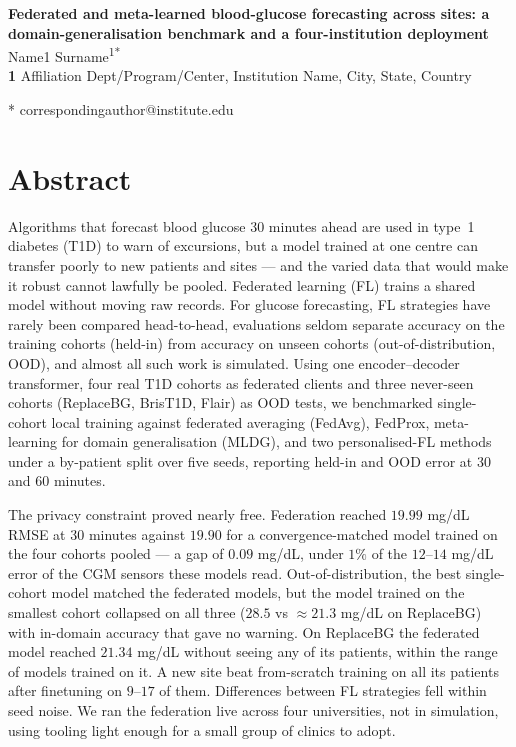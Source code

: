 \documentclass[10pt,letterpaper]{article}
\begin{document}
\vspace*{0.2in}

\begin{flushleft}
{\Large
\textbf{Federated and meta-learned blood-glucose forecasting across sites: a domain-generalisation benchmark and a four-institution deployment}
}
\newline
\\
Name1 Surname\textsuperscript{1*}
\\
\bigskip
\textbf{1} Affiliation Dept/Program/Center, Institution Name, City, State, Country
\\
\bigskip

* correspondingauthor@institute.edu

\end{flushleft}

\section*{Abstract}
Algorithms that forecast blood glucose 30 minutes ahead are used in type~1
diabetes (T1D) to warn of excursions, but a model trained at one centre can
transfer poorly to new patients and sites --- and the varied data that would
make it robust cannot lawfully be pooled. Federated learning (FL)
trains a shared model without moving raw records. For glucose forecasting, FL
strategies have rarely been compared head-to-head, evaluations
seldom separate accuracy on the training cohorts (held-in) from accuracy on
unseen cohorts (out-of-distribution, OOD), and almost all such work is
simulated. Using one encoder--decoder transformer, four real T1D cohorts as
federated clients and three never-seen cohorts (ReplaceBG, BrisT1D, Flair) as
OOD tests, we benchmarked single-cohort local training against federated
averaging (FedAvg), FedProx, meta-learning for domain generalisation (MLDG),
and two personalised-FL methods under a by-patient split over five seeds,
reporting held-in and OOD error at 30 and 60 minutes.

The privacy constraint proved nearly free. Federation reached $19.99$ mg/dL
RMSE at 30 minutes against $19.90$ for a convergence-matched model trained on
the four cohorts pooled --- a gap of $0.09$ mg/dL, under $1\%$ of the
$12$--$14$ mg/dL error of the CGM sensors these models read.
Out-of-distribution, the best single-cohort model matched the federated
models, but the model trained on the smallest cohort collapsed on all three
($28.5$ vs $\approx$$21.3$ mg/dL on ReplaceBG) with in-domain accuracy that
gave no warning. On ReplaceBG the federated model reached $21.34$ mg/dL
without seeing any of its patients, within the range of models trained on it.
A new site beat from-scratch training on all its patients after finetuning on
$9$--$17$ of them. Differences between FL strategies fell within seed noise.
We ran the federation live across four universities, not in simulation, using
tooling light enough for a small group of clinics to adopt.
\end{document}
